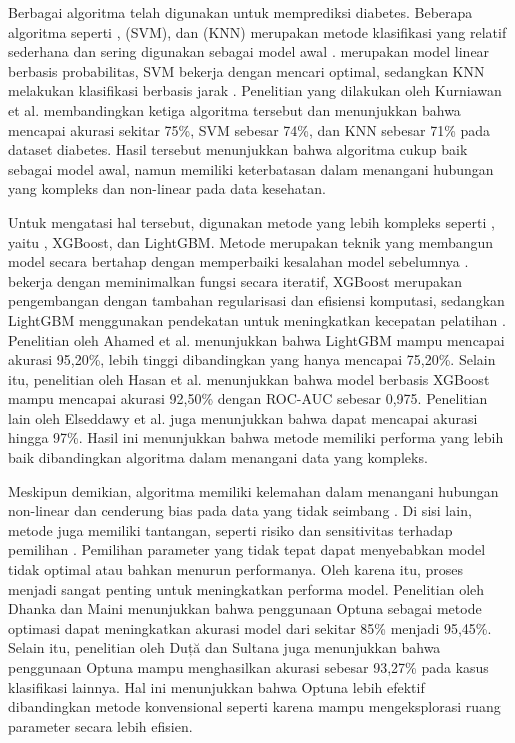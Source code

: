 Berbagai algoritma  telah digunakan untuk memprediksi diabetes. Beberapa algoritma  seperti ,  (SVM), dan  (KNN) merupakan metode klasifikasi yang relatif sederhana dan sering digunakan sebagai model awal \cite{ref10}.  merupakan model linear berbasis probabilitas, SVM bekerja dengan mencari  optimal, sedangkan KNN melakukan klasifikasi berbasis jarak \cite{ref11}. Penelitian yang dilakukan oleh Kurniawan et al. \cite{ref10} membandingkan ketiga algoritma tersebut dan menunjukkan bahwa  mencapai akurasi sekitar 75\%, SVM sebesar 74\%, dan KNN sebesar 71\% pada dataset diabetes. Hasil tersebut menunjukkan bahwa algoritma  cukup baik sebagai model awal, namun memiliki keterbatasan dalam menangani hubungan yang kompleks dan non-linear pada data kesehatan.

Untuk mengatasi hal tersebut, digunakan metode yang lebih kompleks seperti , yaitu , XGBoost, dan LightGBM. Metode  merupakan teknik  yang membangun model secara bertahap dengan memperbaiki kesalahan model sebelumnya \cite{ref12}.  bekerja dengan meminimalkan fungsi  secara iteratif, XGBoost merupakan pengembangan dengan tambahan regularisasi dan efisiensi komputasi, sedangkan LightGBM menggunakan pendekatan  untuk meningkatkan kecepatan pelatihan \cite{ref13}. Penelitian oleh Ahamed et al. \cite{ref14} menunjukkan bahwa LightGBM mampu mencapai akurasi 95,20\%, lebih tinggi dibandingkan  yang hanya mencapai 75,20\%. Selain itu, penelitian oleh Hasan et al. \cite{ref15} menunjukkan bahwa model berbasis XGBoost mampu mencapai akurasi 92,50\% dengan ROC-AUC sebesar 0,975. Penelitian lain oleh Elseddawy et al. \cite{ref16} juga menunjukkan bahwa  dapat mencapai akurasi hingga 97\%. Hasil ini menunjukkan bahwa metode  memiliki performa yang lebih baik dibandingkan algoritma  dalam menangani data yang kompleks.

Meskipun demikian, algoritma  memiliki kelemahan dalam menangani hubungan non-linear dan cenderung bias pada data yang tidak seimbang \cite{ref10}. Di sisi lain, metode  juga memiliki tantangan, seperti risiko  dan sensitivitas terhadap pemilihan  \cite{ref17}. Pemilihan parameter yang tidak tepat dapat menyebabkan model tidak optimal atau bahkan menurun performanya. Oleh karena itu, proses  menjadi sangat penting untuk meningkatkan performa model. Penelitian oleh Dhanka dan Maini \cite{ref17} menunjukkan bahwa penggunaan Optuna sebagai metode optimasi  dapat meningkatkan akurasi model dari sekitar 85\% menjadi 95,45\%. Selain itu, penelitian oleh Duță dan Sultana \cite{ref18} juga menunjukkan bahwa penggunaan Optuna mampu menghasilkan akurasi sebesar 93,27\% pada kasus klasifikasi lainnya. Hal ini menunjukkan bahwa Optuna lebih efektif dibandingkan metode konvensional seperti  karena mampu mengeksplorasi ruang parameter secara lebih efisien.

